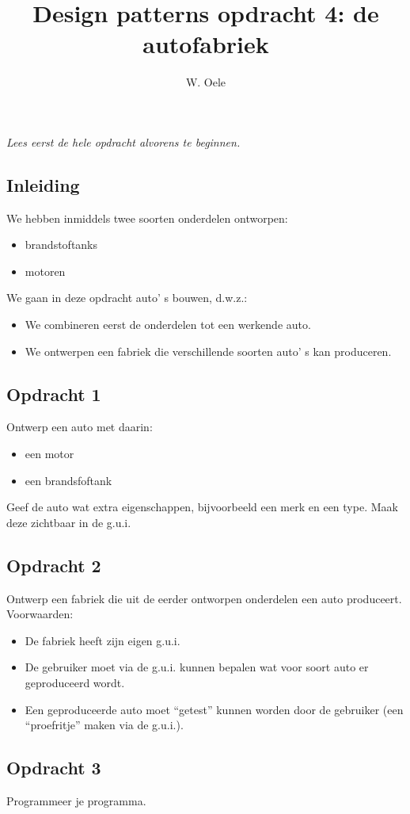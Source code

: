 \documentclass[fleqn,11pt]{article}
\title{Design patterns opdracht 4: de autofabriek}
\author{W. Oele}
\begin{document}
\sffamily
\maketitle
\newpage
\emph{Lees eerst de hele opdracht alvorens te beginnen.}

\subsection*{Inleiding}
We hebben inmiddels twee soorten onderdelen ontworpen:
\begin{itemize}
\item brandstoftanks
\item motoren
\end{itemize}

We gaan in deze opdracht auto' s bouwen, d.w.z.:
\begin{itemize}
\item We combineren eerst de onderdelen tot een werkende auto.
\item We ontwerpen een fabriek die verschillende soorten auto' s kan produceren.
\end{itemize}

\subsection*{Opdracht 1}
Ontwerp een auto met daarin:
\begin{itemize}
\item een motor
\item een brandsfoftank
\end{itemize}
Geef de auto wat extra eigenschappen, bijvoorbeeld een merk en een type. Maak deze zichtbaar in de g.u.i.


\subsection*{Opdracht 2}
Ontwerp een fabriek die uit de eerder ontworpen onderdelen een auto produceert. Voorwaarden:
\begin{itemize}
\item De fabriek heeft zijn eigen g.u.i.
\item De gebruiker moet via de g.u.i. kunnen bepalen wat voor soort auto er geproduceerd wordt.
\item Een geproduceerde auto moet ``getest'' kunnen worden door de gebruiker (een ``proefritje'' maken via de g.u.i.).
\end{itemize}

\subsection*{Opdracht 3}
Programmeer je programma.
\begin{center}
\end{center}
\end{document}
